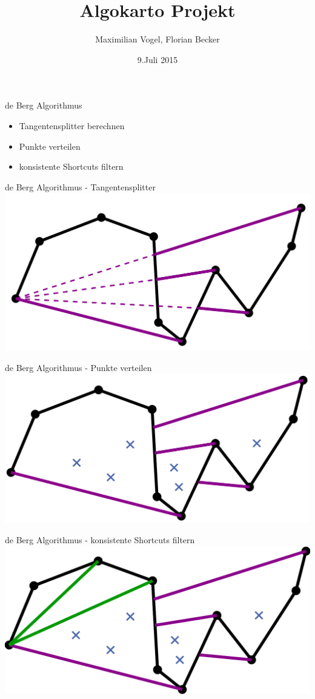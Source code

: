 \documentclass[14pt]{beamer}
\title[AlgoKarto]{Algokarto Projekt}
\author[Maximilian Vogel, Florian Becker]{Maximilian Vogel, Florian Becker}
\date[9.Juli 2015]{9.Juli 2015}
\begin{document}
\begin{frame}
\large
  \titlepage
\end{frame}

\begin{frame}{de Berg Algorithmus}
  \begin{itemize}
        \item Tangentensplitter berechnen
        \item Punkte verteilen
        \item konsistente Shortcuts filtern
  \end{itemize}
\end{frame}

\begin{frame}{de Berg Algorithmus - Tangentensplitter}
\includegraphics[width=1.0\textwidth]{img/tangentsplitter.png}
\end{frame}

\begin{frame}{de Berg Algorithmus - Punkte verteilen}
\includegraphics[width=1.0\textwidth]{img/distributepoints.png}
\end{frame}

\begin{frame}{de Berg Algorithmus - konsistente Shortcuts filtern}
\includegraphics[width=1.0\textwidth]{img/discard_accept.png}
\end{frame}
\end{document}
